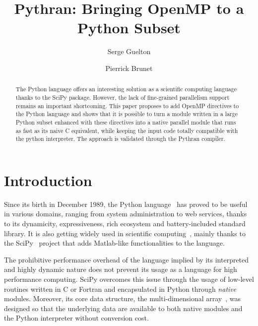 \documentclass{llncs}
\begin{document}
\renewcommand{\thelstlisting}{\arabic{lstlisting}}
%
\title{Pythran: Bringing OpenMP to a Python Subset}

\author{Serge Guelton \and Pierrick Brunet}


\maketitle

%
\begin{abstract}

    The Python language offers an interesting solution as a scientific
    computing language thanks to the SciPy package. However, the lack of
    fine-grained parallelism support remains an important shortcoming. This
    paper proposes to add OpenMP directives to the Python language and shows
    that it is possible to turn a module written in a large Python subset
    enhanced with these directives into a native parallel module that runs as
    fast as its naive C equivalent, while keeping the input code totally
    compatible with the python interpreter. The approach is validated through
    the Pythran compiler.

\end{abstract}

%
\section{Introduction}

Since its birth in December 1989, the Python language~\cite{rossum97} has proved
to be useful in various domains, ranging from system administration to web
services, thanks to its dynamicity, expressiveness, rich ecosystem and
battery-included standard library. It is also getting widely used in scientific
computing~\cite{Oliphant2007}, mainly thanks to the SciPy~\cite{scipy} project
that adds Matlab-like functionalities to the language.

The prohibitive performance overhead of the language implied by its interpreted
and highly dynamic nature does not prevent its usage as a language for high
performance computing. SciPy overcomes this issue through the usage of low-level
routines written in C or Fortran and encapsulated in Python through
\emph{native} modules. Moreover, its core data structure, the multi-dimensional
array~\cite{numpyarray2011}, was designed so that the underlying data are
available to both native modules and the Python interpreter without conversion
cost.
\end{document}
